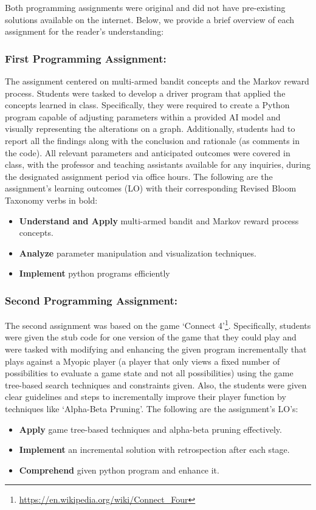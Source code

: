 Both programming assignments were original and did not have pre-existing solutions available on the internet. Below, we provide a brief overview of each assignment for the reader's understanding:

\subsubsection{First Programming Assignment:} The assignment centered on multi-armed bandit concepts and the Markov reward process. Students were tasked to develop a driver program that applied the concepts learned in class. Specifically, they were required to create a Python program capable of adjusting parameters within a provided AI model and visually representing the alterations on a graph. Additionally, students had to report all the findings along with the conclusion and rationale (as comments in the code). All relevant parameters and anticipated outcomes were covered in class, with the professor and teaching assistants available for any inquiries, during the designated assignment period via office hours. The following are the assignment's learning outcomes (LO) with their corresponding Revised Bloom Taxonomy \cite{bloomsTaxonomy} verbs in bold:
\begin{itemize}
    \item \textbf{Understand and Apply} multi-armed bandit and Markov reward process concepts. 
    \item \textbf{Analyze} parameter manipulation and visualization techniques. 
    \item \textbf{Implement} python programs efficiently 
\end{itemize}

\subsubsection{Second Programming Assignment:} The second assignment was based on the game `Connect 4'\footnote{\url{https://en.wikipedia.org/wiki/Connect_Four}}. Specifically, students were given the stub code for one version of the game that they could play and were tasked with modifying and enhancing the given program incrementally that plays against a Myopic player (a player that only views a fixed number of possibilities to evaluate a game state and not all possibilities) using the game tree-based search techniques and constraints given. Also, the students were given clear guidelines and steps to incrementally improve their player function by techniques like `Alpha-Beta Pruning'. The following are the assignment's LO's:
\begin{itemize}
    \item \textbf{Apply} game tree-based techniques and alpha-beta pruning effectively.
    \item \textbf{Implement} an incremental solution with retrospection after each stage.  
    \item \textbf{Comprehend} given python program and enhance it.
\end{itemize}

